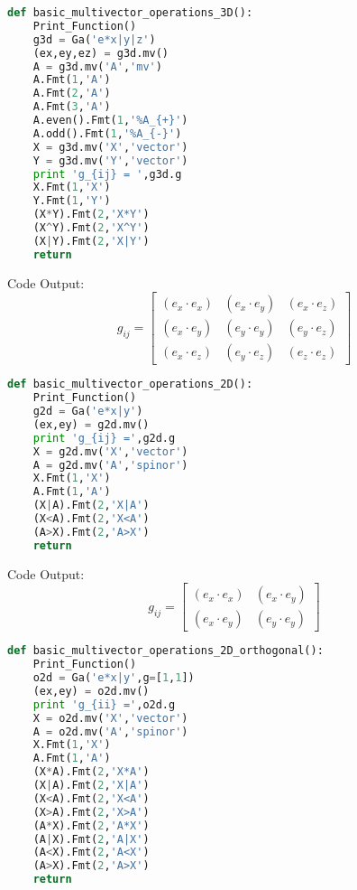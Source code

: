 \documentclass[10pt,fleqn]{report}
\begin{document}
\begin{lstlisting}[language=Python,showspaces=false,showstringspaces=false,backgroundcolor=\color{gray},frame=single]
def basic_multivector_operations_3D():
    Print_Function()
    g3d = Ga('e*x|y|z')
    (ex,ey,ez) = g3d.mv()
    A = g3d.mv('A','mv')
    A.Fmt(1,'A')
    A.Fmt(2,'A')
    A.Fmt(3,'A')
    A.even().Fmt(1,'%A_{+}')
    A.odd().Fmt(1,'%A_{-}')
    X = g3d.mv('X','vector')
    Y = g3d.mv('Y','vector')
    print 'g_{ij} = ',g3d.g
    X.Fmt(1,'X')
    Y.Fmt(1,'Y')
    (X*Y).Fmt(2,'X*Y')
    (X^Y).Fmt(2,'X^Y')
    (X|Y).Fmt(2,'X|Y')
    return
\end{lstlisting}
Code Output:
\begin{equation*} g_{ij} =  \left[\begin{matrix}\left ( e_{x}\cdot e_{x}\right )  & \left ( e_{x}\cdot e_{y}\right )  & \left ( e_{x}\cdot e_{z}\right ) \\\left ( e_{x}\cdot e_{y}\right )  & \left ( e_{y}\cdot e_{y}\right )  & \left ( e_{y}\cdot e_{z}\right ) \\\left ( e_{x}\cdot e_{z}\right )  & \left ( e_{y}\cdot e_{z}\right )  & \left ( e_{z}\cdot e_{z}\right ) \end{matrix}\right] \end{equation*}
\begin{lstlisting}[language=Python,showspaces=false,showstringspaces=false,backgroundcolor=\color{gray},frame=single]
def basic_multivector_operations_2D():
    Print_Function()
    g2d = Ga('e*x|y')
    (ex,ey) = g2d.mv()
    print 'g_{ij} =',g2d.g
    X = g2d.mv('X','vector')
    A = g2d.mv('A','spinor')
    X.Fmt(1,'X')
    A.Fmt(1,'A')
    (X|A).Fmt(2,'X|A')
    (X<A).Fmt(2,'X<A')
    (A>X).Fmt(2,'A>X')
    return
\end{lstlisting}
Code Output:
\begin{equation*} g_{ij} = \left[\begin{matrix}\left ( e_{x}\cdot e_{x}\right )  & \left ( e_{x}\cdot e_{y}\right ) \\\left ( e_{x}\cdot e_{y}\right )  & \left ( e_{y}\cdot e_{y}\right ) \end{matrix}\right] \end{equation*}
\begin{lstlisting}[language=Python,showspaces=false,showstringspaces=false,backgroundcolor=\color{gray},frame=single]
def basic_multivector_operations_2D_orthogonal():
    Print_Function()
    o2d = Ga('e*x|y',g=[1,1])
    (ex,ey) = o2d.mv()
    print 'g_{ii} =',o2d.g
    X = o2d.mv('X','vector')
    A = o2d.mv('A','spinor')
    X.Fmt(1,'X')
    A.Fmt(1,'A')
    (X*A).Fmt(2,'X*A')
    (X|A).Fmt(2,'X|A')
    (X<A).Fmt(2,'X<A')
    (X>A).Fmt(2,'X>A')
    (A*X).Fmt(2,'A*X')
    (A|X).Fmt(2,'A|X')
    (A<X).Fmt(2,'A<X')
    (A>X).Fmt(2,'A>X')
    return
\end{lstlisting}
\end{document}
